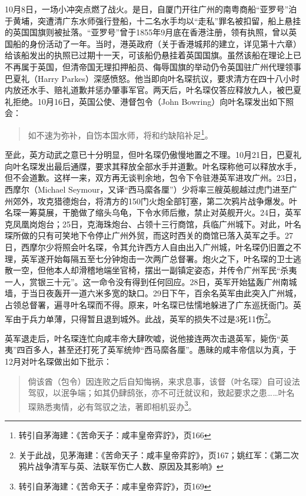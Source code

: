 10月8日，一场小冲突点燃了战火。是日，自厦门开往广州的南粤商船“亚罗号”泊于黄埔，突遭清广东水师强行登船，十二名水手均以“走私”罪名被扣留，船上悬挂的英国国旗则被扯落。“亚罗号”曾于1855年9月底在香港注册，领有执照，曾以英国船的身份活动了一年。当时，港英政府（关于香港城邦的建立，详见第十六章）给该船发出的执照已过期十一天，可该船仍悬挂着英国国旗。虽然该船在理论上已不再属于英国，但清帝国无理扣押船员、侮辱国旗的举动仍令英国驻广州代理领事巴夏礼（Harry Parkes）深感愤怒。他当即向叶名琛抗议，要求清方在四十八小时内放还水手、赔礼道歉并惩办肇事军官。两天后，叶名琛仅答应释放九人，被巴夏礼拒绝。10月16日，英国公使、港督包令（John Bowring）向叶名琛发出如下照会：

\begin{quote}

如不速为弥补，自饬本国水师，将和约缺陷补足\footnote{转引自茅海建：《苦命天子：咸丰皇帝弈詝》，页166}。

\end{quote}

至此，英方动武之意已十分明显，但叶名琛仍傲慢地置之不理。10月21日，巴夏礼向叶名琛发出最后通牒，要求其释放全部水手并道歉。叶名琛称他可以释放水手，但不会道歉。这样一来，双方再无谈判余地，包令下令驻港英军进攻广州。23日，西摩尔（Michael Seymour，又译“西马縻各厘”）少将率三艘英舰越过虎门进至广州郊外，攻克猎德炮台，将清方的150门火炮全部钉塞，第二次鸦片战争爆发。叶名琛一筹莫展，干脆做了缩头乌龟，下令水师后撤，禁止对英舰开火。24日，英军克凤凰岗炮台；25日，克海珠炮台、占领十三行商馆，兵临广州城下。对此，叶名琛所做的只有可笑地下令停止广州外贸，而这时西关的商馆已落入英军之手。27日，西摩尔少将照会叶名琛，令其允许西方人自由出入广州城，叶名琛仍旧置之不理，英军遂开始每隔五至七分钟炮击一次两广总督署。炮火之下，叶名琛的卫士逃散一空，但他本人却滑稽地端坐官椅，摆出一副镇定姿态，并传令广州军民“杀夷一人，赏银三十元”。这一命令没有得到任何回应。28日，英军开始猛轰广州南城墙，于当日夜轰开一道六米多宽的缺口。29日下午，百余名英军由此突入广州城，占领总督署，遍寻叶名琛而不得。原来，叶名琛已怯懦地躲进了广东巡抚衙门。英军由于兵力单薄，只得暂且退到城外。此战，英军的损失不过是3死11伤\footnote{关于此战，见茅海建：《苦命天子：咸丰皇帝弈詝》，页167；姚红军：《第二次鸦片战争清军与英、法联军伤亡人数、原因及其影响》}。

英军退走后，叶名琛连忙向咸丰帝大肆吹嘘，说他接连两次击退英军，毙伤“英夷”四百多人，甚至还打死了英军统帅“西马縻各厘”。愚昧的咸丰帝信以为真，于12月对叶名琛做出如下批示：

\begin{quote}

倘该酋（包令）因连败之后自知悔祸，来求息事，该督（叶名琛）自可设法驾驭，以泯争端；如其仍肆鸱张，亦不可迁就议和，致起要求之患……叶名琛熟悉夷情，必有驾驭之法，著即相机妥办\footnote{转引自茅海建：《苦命天子：咸丰皇帝弈詝》，页169}。
\end{quote}

